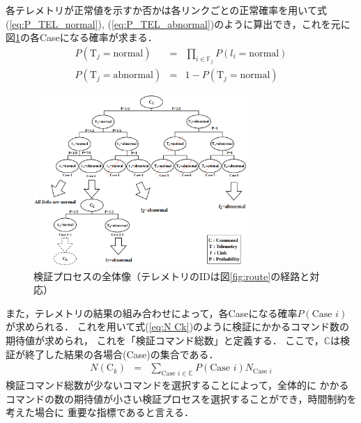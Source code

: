 \documentclass[11pt]{jsarticle}%
\begin{document}
\begin{multicols}{2}
各テレメトリが正常値を示すか否かは各リンクごとの正常確率を用いて式(\ref{eq:P_TEL_normal}),
(\ref{eq:P_TEL_abnormal})のように算出でき，これを元に図\ref{fig:all_process}の各Caseになる確率が求まる．
\begin{eqnarray}
  P(\text{T}_j = \text{normal}) &=& \prod_{i\in\mathbb{F}_j} P(l_i = \text{normal}) \label{eq:P_TEL_normal}\\
  P(\text{T}_j = \text{abnormal}) &=& 1 - P(\text{T}_j = \text{normal}) \label{eq:P_TEL_abnormal}
\end{eqnarray}
\vspace{-1zh}
\begin{figure}[H]
  \centering
    \includegraphics[height=6.5cm]{../figure/all_process.png}
    \caption{検証プロセスの全体像（テレメトリのIDは図\ref{fig:route}の経路と対応）}
    \label{fig:all_process}
\end{figure}
\vspace{-1zh}
また，テレメトリの結果の組み合わせによって，各Caseになる確率$P(\text{Case }i)$が求められる．
これを用いて式(\ref{eq:N Ck})のように検証にかかるコマンド数の期待値が求められ，
これを「検証コマンド総数」と定義する．
ここで，$\mathbb{C}$は検証が終了した結果の各場合(Case)の集合である．%
\begin{eqnarray}
  N(\text{C}_k) &=& \sum_{\text{Case }i\in\mathbb{C}} P(\text{Case }i) N_{\text{Case }i} \label{eq:N Ck}
\end{eqnarray}
検証コマンド総数が少ないコマンドを選択することによって，全体的に
かかるコマンドの数の期待値が小さい検証プロセスを選択することができ，時間制約を考えた場合に
重要な指標であると言える．
\vspace{-1zh}

\end{multicols}
\end{document}
